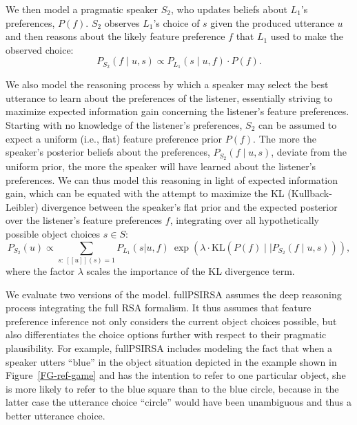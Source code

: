 \documentclass[11pt,a4paper]{article}
\newcommand{\gcs}[1]{\textcolor{blue}{[gcs: #1]}}
\begin{document}
We then model a pragmatic speaker $S_2$, who updates beliefs about $L_1$'s preferences, $P(f)$.
$S_2$ observes $L_1$'s choice of $s$ given the produced utterance $u$ and then reasons about the likely feature preference $f$ that $L_1$ used to make the observed choice:
\begin{equation}
P_{S_{2}}(f\mid u,s) \propto P_{L_{1}}(s \mid u,f) \cdot P(f).
\end{equation}


We also model the reasoning process by which a speaker may select the best utterance to learn about the preferences of the listener, essentially striving to maximize expected information gain concerning the listener's feature preferences.
Starting with no knowledge of the listener's preferences, $S_2$ can be assumed to expect a uniform (i.e., flat) feature preference prior $P(f)$.
The more the speaker's posterior beliefs about the preferences, $P_{S_{2}}(f\mid u,s)$, deviate from the uniform prior, the more the speaker will have learned about the listener's preferences. 
We can thus model this reasoning in light of expected information gain, which can be equated with the attempt to maximize the KL (Kullback-Leibler) divergence between the speaker's flat prior and the expected posterior over the listener's feature preferences $f$, integrating over all hypothetically possible object choices $s \in S$: %
\begin{equation}
P_{S_2}(u) \propto \sum_{s:\  [\![u]\!](s)=1} P_{L_1}(s|u,f)\ \exp(\lambda \cdot \textrm{KL}(P(f)\mid\mid P_{S_{2}}(f\mid u,s))),
\label{eq:kldivlambda}
\end{equation}
where the factor $\lambda$ scales the importance of the KL divergence term. 


We evaluate two versions of the model. 
fullPSIRSA assumes the deep reasoning process integrating the full RSA formalism.  
It thus assumes that feature preference inference not only considers the current object choices possible, but also differentiates the choice options further with respect to their pragmatic plausibility. 
For example, fullPSIRSA includes modeling the fact that when a speaker utters ``blue'' in the object situation depicted in the example shown in Figure~\ref{FG-ref-game} and has the intention to refer to one particular object, she is more likely to refer to the blue square than to the blue circle, because in the latter case the utterance choice ``circle'' would have been unambiguous and thus a better utterance choice.
\end{document}
